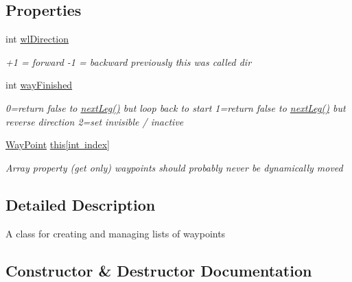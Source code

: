 \subsection*{Properties}
\begin{DoxyCompactItemize}
\item 
int \mbox{\hyperlink{class_r_c___framework_1_1_way_point_list_ab0df171ffd39426546ab8c8e44f5a464}{wl\+Direction}}
\begin{DoxyCompactList}\small\item\em +1 = forward -\/1 = backward previously this was called dir \end{DoxyCompactList}\item 
int \mbox{\hyperlink{class_r_c___framework_1_1_way_point_list_a458d4b048929d665adaeb7f99e02a246}{way\+Finished}}
\begin{DoxyCompactList}\small\item\em 0=return false to \mbox{\hyperlink{class_r_c___framework_1_1_way_point_list_aa1d992bceb400ee9fcf657e6a4c379f8}{next\+Leg()}} but loop back to start 1=return false to \mbox{\hyperlink{class_r_c___framework_1_1_way_point_list_aa1d992bceb400ee9fcf657e6a4c379f8}{next\+Leg()}} but reverse direction 2=set invisible / inactive \end{DoxyCompactList}\item 
\mbox{\hyperlink{class_r_c___framework_1_1_way_point}{Way\+Point}} \mbox{\hyperlink{class_r_c___framework_1_1_way_point_list_ad4aa13b191657a06490f39b452ca1204}{this\mbox{[}int index\mbox{]}}}
\begin{DoxyCompactList}\small\item\em Array property (get only) waypoints should probably never be dynamically moved \end{DoxyCompactList}\end{DoxyCompactItemize}


\subsection{Detailed Description}
A class for creating and managing lists of waypoints 



\subsection{Constructor \& Destructor Documentation}
\mbox{\label{class_r_c___framework_1_1_way_point_list_a0928340fd1b2b35c0a65781d192c68bb}} 

